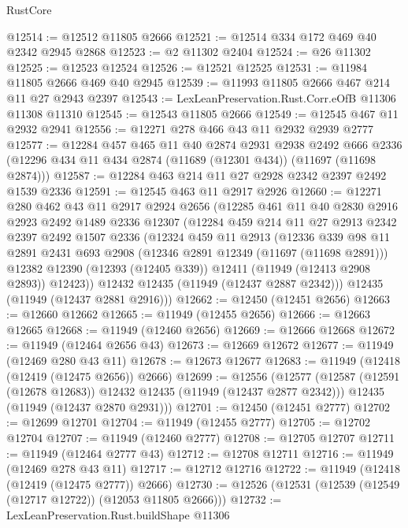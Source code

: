 \begin{lexlean}{RustCore}
\begin{coremodule}
@12514 := @12512 @11805 @2666
@12521 := @12514 @334 @172 @469 @40 @2342 @2945 @2868
@12523 := @2 @11302 @2404
@12524 := @26 @11302
@12525 := @12523 @12524
@12526 := @12521 @12525
@12531 := @11984 @11805 @2666 @469 @40 @2945
@12539 := @11993 @11805 @2666 @467 @214 @11 @27 @2943 @2397
@12543 := LexLeanPreservation.Rust.Corr.eOfB @11306 @11308 @11310
@12545 := @12543 @11805 @2666
@12549 := @12545 @467 @11 @2932 @2941
@12556 := @12271 @278 @466 @43 @11 @2932 @2939 @2777
@12577 := @12284
    @457
    @465
    @11
    @40
    @2874
    @2931
    @2938
    @2492
    @666
    @2336
    (@12296 @434 @11 @434 @2874 (@11689 (@12301 @434)) (@11697 (@11698 @2874)))
@12587 := @12284 @463 @214 @11 @27 @2928 @2342 @2397 @2492 @1539 @2336
@12591 := @12545 @463 @11 @2917 @2926
@12660 := @12271
    @280
    @462
    @43
    @11
    @2917
    @2924
    @2656
    (@12285
      @461
      @11
      @40
      @2830
      @2916
      @2923
      @2492
      @1489
      @2336
      @12307
      (@12284
        @459
        @214
        @11
        @27
        @2913
        @2342
        @2397
        @2492
        @1507
        @2336
        (@12324
          @459
          @11
          @2913
          (@12336
            @339
            @98
            @11
            @2891
            @2431
            @693
            @2908
            (@12346 @2891 @12349 (@11697 (@11698 @2891)))
            @12382
            @12390
            (@12393 (@12405 @339))
            @12411
            (@11949 (@12413 @2908 @2893))
            @12423))
        @12432
        @12435
        (@11949 (@12437 @2887 @2342)))
      @12435
      (@11949 (@12437 @2881 @2916)))
@12662 := @12450 (@12451 @2656)
@12663 := @12660 @12662
@12665 := @11949 (@12455 @2656)
@12666 := @12663 @12665
@12668 := @11949 (@12460 @2656)
@12669 := @12666 @12668
@12672 := @11949 (@12464 @2656 @43)
@12673 := @12669 @12672
@12677 := @11949 (@12469 @280 @43 @11)
@12678 := @12673 @12677
@12683 := @11949 (@12418 (@12419 (@12475 @2656)) @2666)
@12699 := @12556
    (@12577
      (@12587 (@12591 (@12678 @12683)) @12432 @12435 (@11949 (@12437 @2877 @2342)))
      @12435
      (@11949 (@12437 @2870 @2931)))
@12701 := @12450 (@12451 @2777)
@12702 := @12699 @12701
@12704 := @11949 (@12455 @2777)
@12705 := @12702 @12704
@12707 := @11949 (@12460 @2777)
@12708 := @12705 @12707
@12711 := @11949 (@12464 @2777 @43)
@12712 := @12708 @12711
@12716 := @11949 (@12469 @278 @43 @11)
@12717 := @12712 @12716
@12722 := @11949 (@12418 (@12419 (@12475 @2777)) @2666)
@12730 := @12526 (@12531 (@12539 (@12549 (@12717 @12722)) (@12053 @11805 @2666)))
@12732 := LexLeanPreservation.Rust.buildShape @11306

\end{coremodule}
\end{lexlean}
